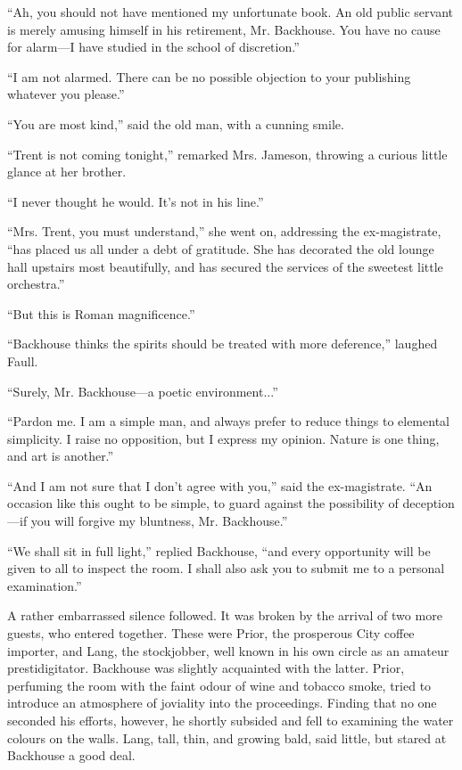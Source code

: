 ``Ah, you should not have mentioned my unfortunate book. An old public servant is merely amusing himself in his retirement, Mr. Backhouse. You have no cause for alarm—I have studied in the school of discretion.''

``I am not alarmed. There can be no possible objection to your publishing whatever you please.''

``You are most kind,'' said the old man, with a cunning smile.

``Trent is not coming tonight,'' remarked Mrs. Jameson, throwing a curious little glance at her brother.

``I never thought he would. It's not in his line.''

``Mrs. Trent, you must understand,'' she went on, addressing the ex-magistrate, ``has placed us all under a debt of gratitude. She has decorated the old lounge hall upstairs most beautifully, and has secured the services of the sweetest little orchestra.''

``But this is Roman magnificence.''

``Backhouse thinks the spirits should be treated with more deference,'' laughed Faull.

``Surely, Mr. Backhouse—a poetic environment...''

``Pardon me. I am a simple man, and always prefer to reduce things to elemental simplicity. I raise no opposition, but I express my opinion. Nature is one thing, and art is another.''

``And I am not sure that I don't agree with you,'' said the ex-magistrate. ``An occasion like this ought to be simple, to guard against the possibility of deception—if you will forgive my bluntness, Mr. Backhouse.''

``We shall sit in full light,'' replied Backhouse, ``and every opportunity will be given to all to inspect the room. I shall also ask you to submit me to a personal examination.''

A rather embarrassed silence followed. It was broken by the arrival of two more guests, who entered together. These were Prior, the prosperous City coffee importer, and Lang, the stockjobber, well known in his own circle as an amateur prestidigitator. Backhouse was slightly acquainted with the latter. Prior, perfuming the room with the faint odour of wine and tobacco smoke, tried to introduce an atmosphere of joviality into the proceedings. Finding that no one seconded his efforts, however, he shortly subsided and fell to examining the water colours on the walls. Lang, tall, thin, and growing bald, said little, but stared at Backhouse a good deal.

